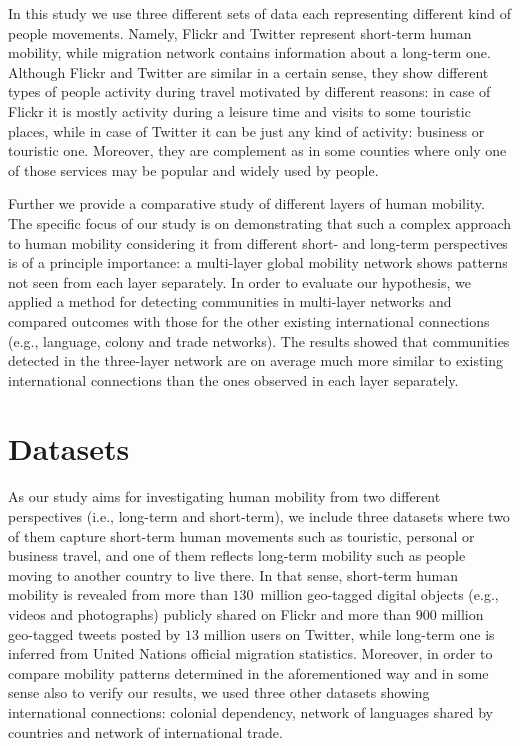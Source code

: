 \documentclass[aps,superscriptaddress,showkeys,nofootinbib]{revtex4-1}
\begin{document}
In this study we use three different sets of data each representing different kind of people movements. Namely, Flickr and Twitter represent short-term human mobility, while migration network contains information about a long-term one. Although Flickr and Twitter are similar in a certain sense, they show different types of people activity during travel motivated by different reasons: in case of Flickr it is mostly activity during a leisure time and visits to some touristic places, while in case of Twitter it can be just any kind of activity: business or touristic one. 
Moreover, they are complement as in some counties where only one of those services may be popular and widely used by people. 

Further we provide a comparative study of different layers of human mobility. The specific focus of our study is on demonstrating that such a complex approach to human mobility considering it from different short- and long-term perspectives is of a principle importance: a multi-layer global mobility network shows patterns not seen from each layer separately. In order to evaluate our hypothesis, we applied a method for detecting communities in multi-layer networks and compared outcomes with those for the other existing international connections (e.g., language, colony and trade networks). The results showed that communities detected in the three-layer network are on average much more similar to existing international connections than the ones observed in each layer separately.

\section{Datasets}
\label{sec:networks}

As our study aims for investigating human mobility from two different perspectives (i.e., long-term and short-term), we include three datasets where two of them capture short-term human movements such as touristic, personal or business travel, and one of them reflects long-term mobility such as people moving to another country to live there. In that sense, short-term human mobility is revealed from more than $130$~million geo-tagged digital objects (e.g., videos and photographs) publicly shared on Flickr and more than $900$ million geo-tagged tweets posted by $13$ million users on Twitter, while long-term one is inferred from United Nations official migration statistics. Moreover, in order to compare mobility patterns determined in the aforementioned way and in some sense also to verify our results, we used three other datasets showing international connections: colonial dependency, network of languages shared by countries and network of international trade.
\end{document}
